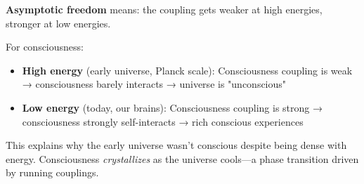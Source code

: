 \begin{intuitive}
\textbf{Asymptotic freedom} means: the coupling gets weaker at high energies, stronger at low energies.

For consciousness:
\begin{itemize}
\item \textbf{High energy} (early universe, Planck scale): Consciousness coupling is weak → consciousness barely interacts → universe is "unconscious"
\item \textbf{Low energy} (today, our brains): Consciousness coupling is strong → consciousness strongly self-interacts → rich conscious experiences
\end{itemize}

This explains why the early universe wasn't conscious despite being dense with energy. Consciousness \textit{crystallizes} as the universe cools—a phase transition driven by running couplings.
\end{intuitive}

